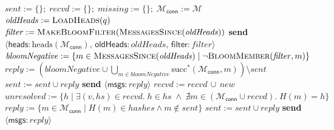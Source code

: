 \documentclass[a4paper,anonymous,USenglish]{lipics-v2019}
\begin{document}
\begin{algorithm}[p]
    \begin{algorithmic}[1]
        \State $\mathit{sent} := \{\};\; \mathit{recvd} := \{\};\; \mathit{missing} := \{\};\; \mathcal{M}_\mathsf{conn} := \mathcal{M}$ 
        \State $\mathit{oldHeads} := \Call{LoadHeads}{q}$\label{line:load-heads2}
        \State $\mathit{filter} := \textsc{MakeBloomFilter}(\Call{MessagesSince}{\mathit{oldHeads}})$\label{line:make-bloom2}
        \State \textbf{send} $\langle\mathsf{heads}: \mathrm{heads}(\mathcal{M}_\mathsf{conn}),\, \mathsf{oldHeads}: \mathit{oldHeads},\, \mathsf{filter}: \mathit{filter}\rangle$ \label{line:a2-send-heads2}
    \EndOn
    \State
        \State $\mathit{bloomNegative} := \{m \in \Call{MessagesSince}{\mathit{oldHeads}} \mid \neg\Call{BloomMember}{\mathit{filter}, m}\}$\label{line:bloom-member2}
        \State $\mathit{reply} := \left(\mathit{bloomNegative} \cup \bigcup_{m \in \mathit{bloomNegative}} \mathrm{succ}^*(\mathcal{M}_\mathsf{conn}, m)\right) \setminus \mathit{sent}$\label{line:bloom-succ2}
            \State $\mathit{sent} := \mathit{sent} \cup \mathit{reply}$
            \State \textbf{send} $\langle\mathsf{msgs}: \mathit{reply}\rangle$ \label{line:a2-heads-reply2}
        \EndIf
        \State {} \label{line:a2-heads-missing2}
    \EndOn
    \State
     \label{line:recv-msgs2}
        \State $\mathit{recvd} := \mathit{recvd} \,\cup\, \mathit{new}$ \label{line:msgs-recvd2}
        \State $\mathit{unresolved} := \{h \mid \exists (v, \mathit{hs}) \in \mathit{recvd}.\; h \in \mathit{hs} \;\wedge\; \nexists m \in (\mathcal{M}_\mathsf{conn} \cup \mathit{recvd}).\; H(m) = h\}$ \label{line:msgs-missing2}
        \State {} \label{line:msgs-handle-missing2}
    \EndOn
    \State
     \label{line:recv-needs2}
        \State $\mathit{reply} := \{m \in \mathcal{M}_\mathsf{conn} \mid H(m) \in \mathit{hashes} \wedge m \notin \mathit{sent}\}$ \label{line:needs-reply2}
        \State $\mathit{sent} := \mathit{sent} \cup \mathit{reply}$
        \State \textbf{send} $\langle\mathsf{msgs}: \mathit{reply}\rangle$ \label{line:send-msgs2}

\end{algorithmic}
\end{algorithm}
\end{document}
